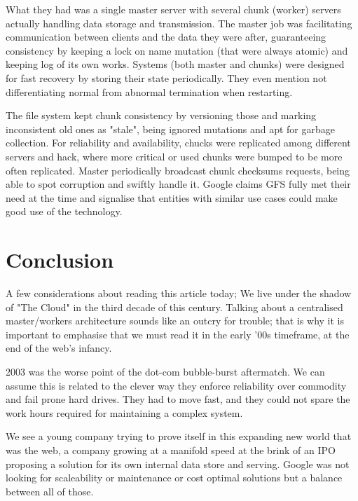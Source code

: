 \documentclass[12pt]{article}
\begin{document}
What they had was a single master server with several chunk (worker) servers actually handling data storage and transmission. The master job was facilitating communication between clients and the data they were after, guaranteeing consistency by keeping a lock on name mutation (that were always atomic) and keeping log of its own works. Systems (both master and chunks) were designed for fast recovery by storing their state periodically. They even mention not differentiating normal from abnormal termination when restarting.

The file system kept chunk consistency by versioning those and marking inconsistent old ones as "stale", being ignored mutations and apt for garbage collection. For reliability and availability, chucks were replicated among different servers and hack, where more critical or used chunks were bumped to be more often replicated. Master periodically broadcast chunk checksums requests, being able to spot corruption and swiftly handle it. Google claims GFS fully met their need at the time and signalise that entities with similar use cases could make good use of the technology.


\section{Conclusion}

A few considerations about reading this article today; We live under the shadow of "The Cloud" in the third decade of this century. Talking about a centralised master/workers architecture sounds like an outcry for trouble; that is why it is important to emphasise that we must read it in the early '00s timeframe, at the end of the web's infancy.

2003 was the worse point of the dot-com bubble-burst aftermatch. We can assume this is related to the clever way they enforce reliability over commodity and fail prone hard drives. 
They had to move fast, and they could not spare the work hours required for maintaining a complex system.

We see a young company trying to prove itself in this expanding new world that was the web, a company growing at a manifold speed at the brink of an IPO proposing a solution for its own internal data store and serving. Google was not looking for scaleability or maintenance or cost optimal solutions but a balance between all of those.




\end{document}
